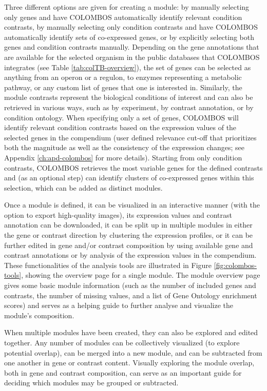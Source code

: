 Three different options are given for creating a module: by manually selecting  only genes and have COLOMBOS automatically identify relevant condition  contrasts, by manually selecting only condition contrasts and have COLOMBOS  automatically identify sets of co-expressed genes, or by explicitly selecting  both genes and condition contrasts manually. Depending on the gene annotations  that are available for the selected organism in the public databases that  COLOMBOS integrates (see Table \ref{tab:colTB-overview}), the set of genes can  be selected as anything from an operon or a regulon, to enzymes representing a  metabolic pathway, or any custom list of genes that one is interested in.  Similarly, the module contrasts represent the biological conditions of interest  and can also be retrieved in various ways, such as by experiment, by contrast  annotation, or by condition ontology. When specifying only a set of genes,  COLOMBOS will identify relevant condition contrasts based on the expression  values of the selected genes in the compendium (user defined relevance cut-off  that prioritizes both the magnitude as well as the consistency of the  expression changes; see Appendix \ref{ch:apd-colombos} for more details).  Starting from only condition contrasts, COLOMBOS retrieves the most variable  genes for the defined contrasts and (as an optional step) can identify clusters  of co-expressed genes within this selection, which can be added as distinct  modules.

Once a module is defined, it can be visualized in an interactive manner (with  the option to export high-quality images), its expression values and contrast  annotation can be downloaded, it can be split up in multiple modules in either  the gene or contrast direction by clustering the expression profiles, or it can  be further edited in gene and/or contrast composition by using available gene  and contrast annotations or by analysis of the expression values in the  compendium. These functionalities of the analysis tools are illustrated in  Figure \ref{fig:colombos-tools}, showing the overview page for a single module.  The module overview page gives some basic module information (such as the  number of included genes and contrasts, the number of missing values, and a  list of Gene Ontology enrichment scores) and serves as a helping guide to  further analyse and visualize the module's composition.

When multiple modules have been created, they can also be explored and edited  together. Any number of modules can be collectively visualized (to explore  potential overlap), can be merged into a new module, and can be subtracted from  one another in gene or contrast content. Visually exploring the module overlap,  both in gene and contrast composition, can serve as an important guide for  deciding which modules may be grouped or subtracted.  

